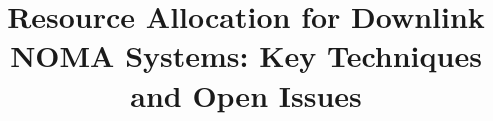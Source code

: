 \documentclass[10pt,final,journal,a4paper,twoside,twocolumn,romanappendices]{IEEEtran}
\theoremstyle{myremark}
\theoremstyle{myremark}
\begin{document}
%
\title{Resource Allocation for Downlink NOMA Systems: Key Techniques and Open Issues}

\author{

}

%



%
\end{document}
